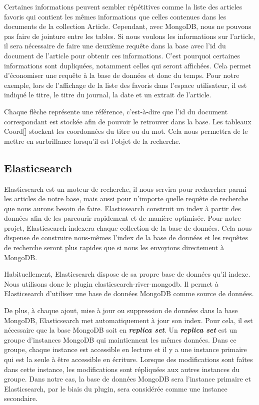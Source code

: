 Certaines informations peuvent sembler répétitives comme la liste des articles favoris qui contient les mêmes informations que celles contenues dans les documents de la collection Article. Cependant, avec MongoDB, nous ne pouvons pas faire de jointure entre les tables. Si nous voulons les informations sur l’article, il sera nécessaire de faire une deuxième requête dans la base avec l’id du document de l’article pour obtenir ces informations. C’est pourquoi certaines informations sont dupliquées, notamment celles qui seront affichées. Cela permet d'économiser une requête à la base de données et donc du temps. Pour notre exemple, lors de l’affichage de la liste des favoris dans l’espace utilisateur, il est indiqué le titre, le titre du journal, la date et un extrait de l’article. 


Chaque flèche représente une référence, c’est-à-dire que l’id du document correspondant est stockée afin de pouvoir le retrouver dans la base. Les tableaux Coord[] stockent les coordonnées du  titre ou du mot. Cela nous permettra de le mettre en surbrillance lorsqu’il est l’objet de la recherche. 

\subsection{Elasticsearch}

Elasticsearch est un moteur de recherche, il nous servira pour rechercher parmi les articles de notre base, mais aussi pour n'importe quelle requête de recherche que nous aurons besoin de faire. Elasticsearch construit un index à partir des données afin de les parcourir rapidement et de manière optimisée. Pour notre projet, Elasticsearch indexera chaque collection de la base de données.  Cela nous dispense de construire nous-mêmes l'index de la base de données et les requêtes de recherche seront plus rapides que si nous les envoyions directement à MongoDB.


Habituellement, Elasticsearch dispose de sa propre base de données qu’il indexe. Nous utilisons donc le plugin elasticsearch-river-mongodb\cite{GitRiver}. Il permet à Elasticsearch d’utiliser une base de données MongoDB comme source de données. 


De plus, à chaque ajout, mise à jour ou suppression de données dans la base MongoDB, Elasticsearch met automatiquement à jour son index. Pour cela, il est nécessaire que la base MongoDB soit en \textbf{\textit{replica set}}.  Un \textbf{\textit{replica set}} est un groupe d’instances MongoDB qui maintiennent les mêmes données. Dans ce groupe, chaque instance est accessible en lecture et il y a une instance primaire qui est la seule à être accessible en écriture. Lorsque des modifications sont faîtes dans cette instance, les modifications sont répliquées aux autres instances du groupe. Dans notre cas, la base de données MongoDB sera l’instance primaire et Elasticsearch, par le biais du plugin, sera considérée comme une instance secondaire.


